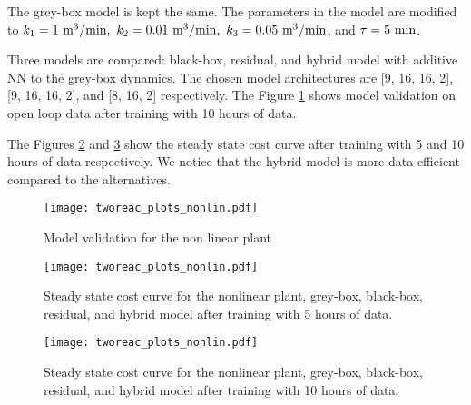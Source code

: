\documentclass{article}
\begin{document}
The grey-box model is kept the same. The parameters 
in the model are modified to 
$k_1 = 1 \ \textnormal{m}^3/\textnormal{min}, 
\ k_2 = 0.01 \ \textnormal{m}^3/\textnormal{min},
\ k_3 = 0.05 \ \textnormal{m}^3/\textnormal{min}$, 
and $\tau = 5 \ \textnormal{min}$.

\newpage
Three models are compared: black-box, residual, and hybrid model with additive 
NN to the grey-box dynamics. The chosen model architectures 
are [9, 16, 16, 2], [9, 16, 16, 2], and [8, 16, 2] respectively.
The Figure \ref{fig:validation_nonlinear} shows model validation on open loop 
data after training with 10 hours of data.

The Figures \ref{fig:cost_nonlinear_5hours} and \ref{fig:cost_nonlinear_10hours}
show the steady state cost curve after training with 5 and 10 hours 
of data respectively. We notice that the hybrid model is more data efficient 
compared to the alternatives.

\begin{figure}[!h]
  \centering
  \texttt{[image: tworeac\_plots\_nonlin.pdf]}
  \caption{Model validation for the non linear plant}
  \label{fig:validation_nonlinear}
\end{figure}



\begin{figure}[!h]
  \centering
  \texttt{[image: tworeac\_plots\_nonlin.pdf]}
  \caption{Steady state cost curve for the nonlinear plant, grey-box, 
  black-box, residual, and hybrid model after training with 5 hours of data.}
  \label{fig:cost_nonlinear_5hours}
\end{figure}

\begin{figure}[!h]
  \centering
  \texttt{[image: tworeac\_plots\_nonlin.pdf]}
  \caption{Steady state cost curve for the nonlinear plant, grey-box, 
  black-box, residual, and hybrid model after training with 10 hours of data.}
  \label{fig:cost_nonlinear_10hours}
\end{figure}
\end{document}

